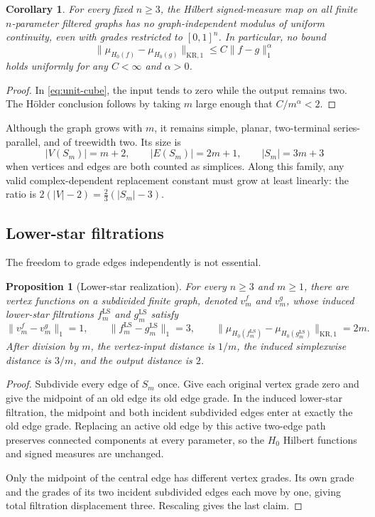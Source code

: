 \documentclass[11pt]{article}
\newtheorem{proposition}[proposition]{Proposition}
\newtheorem{corollary}[corollary]{Corollary}
\theoremstyle{definition}
\newcommand{\1}{\mathbf{1}}
\newcommand{\KR}{\mathrm{KR}}
\begin{document}
\begin{corollary}\label{cor:no-modulus}
For every fixed $n\geq3$, the Hilbert signed-measure map on all finite
$n$-parameter filtered graphs has no graph-independent modulus of uniform
continuity, even with grades restricted to $[0,1]^n$.  In particular, no
bound
\[
  \lVert\mu_{H_0(f)}-\mu_{H_0(g)}\rVert_{\KR,1}
  \leq C\lVert f-g\rVert_1^\alpha
\]
holds uniformly for any $C<\infty$ and $\alpha>0$.
\end{corollary}

\begin{proof}
In \eqref{eq:unit-cube}, the input tends to zero while the output remains
two.  The Hölder conclusion follows by taking $m$ large enough that
$C/m^\alpha<2$.
\end{proof}

Although the graph grows with $m$, it remains simple, planar,
two-terminal series-parallel, and of treewidth two.  Its size is
\[
  |V(S_m)|=m+2,\qquad |E(S_m)|=2m+1,\qquad |S_m|=3m+3
\]
when vertices and edges are both counted as simplices.  Along this family,
any valid complex-dependent replacement constant must grow at least
linearly: the ratio is
$2(|V|-2)=\tfrac23(|S_m|-3)$.

\subsection{Lower-star filtrations}

The freedom to grade edges independently is not essential.

\begin{proposition}[Lower-star realization]\label{prop:lower-star}
For every $n\geq3$ and $m\geq1$, there are vertex functions on a subdivided
finite graph, denoted $v_m^f$ and $v_m^g$, whose induced lower-star
filtrations $f_m^{\mathrm{LS}}$ and $g_m^{\mathrm{LS}}$ satisfy
\[
  \lVert v_m^f-v_m^g\rVert_1=1,\qquad
  \lVert f_m^{\mathrm{LS}}-g_m^{\mathrm{LS}}\rVert_1=3,
  \qquad
  \bigl\lVert
    \mu_{H_0(f_m^{\mathrm{LS}})}
    -\mu_{H_0(g_m^{\mathrm{LS}})}
  \bigr\rVert_{\KR,1}=2m.
\]
After division by $m$, the vertex-input distance is $1/m$, the induced
simplexwise distance is $3/m$, and the output distance is $2$.
\end{proposition}

\begin{proof}
Subdivide every edge of $S_m$ once.  Give each original vertex grade zero
and give the midpoint of an old edge its old edge grade.  In the induced
lower-star filtration, the midpoint and both incident subdivided edges enter
at exactly the old edge grade.  Replacing an active old edge by this active
two-edge path preserves connected components at every parameter, so the
$H_0$ Hilbert functions and signed measures are unchanged.

Only the midpoint of the central edge has different vertex grades.  Its own
grade and the grades of its two incident subdivided edges each move by one,
giving total filtration displacement three.  Rescaling gives the last
claim.
\end{proof}
\end{document}

